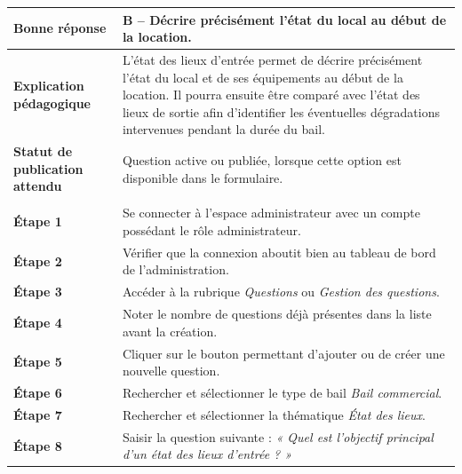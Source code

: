\begin{longtable}{
    |>{\raggedright\arraybackslash}p{}
    |>{\raggedright\arraybackslash}p{}|
}
\textbf{Bonne réponse}
&
B -- Décrire précisément l'état du local au début de la location.
\\
\hline

\textbf{Explication pédagogique}
&
L'état des lieux d'entrée permet de décrire précisément l'état du local et
de ses équipements au début de la location. Il pourra ensuite être comparé
avec l'état des lieux de sortie afin d'identifier les éventuelles
dégradations intervenues pendant la durée du bail.
\\
\hline

\textbf{Statut de publication attendu}
&
Question active ou publiée, lorsque cette option est disponible dans le
formulaire.
\\
\hline


\rowcolor{orange!15}
\multicolumn{2}{|c|}{
    \textbf{Déroulement du test}
}
\\
\hline

\textbf{Étape 1}
&
Se connecter à l'espace administrateur avec un compte possédant le rôle
administrateur.
\\
\hline

\textbf{Étape 2}
&
Vérifier que la connexion aboutit bien au tableau de bord de
l'administration.
\\
\hline

\textbf{Étape 3}
&
Accéder à la rubrique \textit{Questions} ou
\textit{Gestion des questions}.
\\
\hline

\textbf{Étape 4}
&
Noter le nombre de questions déjà présentes dans la liste avant la création.
\\
\hline

\textbf{Étape 5}
&
Cliquer sur le bouton permettant d'ajouter ou de créer une nouvelle
question.
\\
\hline

\textbf{Étape 6}
&
Rechercher et sélectionner le type de bail
\textit{Bail commercial}.
\\
\hline

\textbf{Étape 7}
&
Rechercher et sélectionner la thématique
\textit{État des lieux}.
\\
\hline

\textbf{Étape 8}
&
Saisir la question suivante :
\textit{« Quel est l'objectif principal d'un état des lieux d'entrée ? »}
\\
\hline


\end{longtable}
